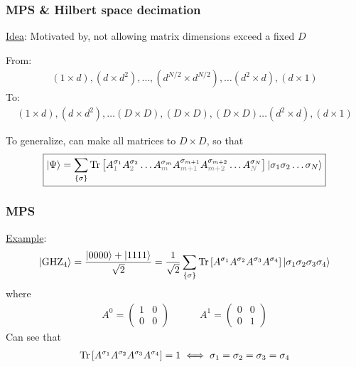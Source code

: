 \documentclass{beamer}
\theoremstyle{definition}
\newcommand{\lb}{\left[}
\newcommand{\rb}{\right]}
\newcommand{\f}[2]{\frac{#1}{#2}}
\begin{document}
\begin{frame}
	\frametitle{MPS \& Hilbert space decimation}
	\underline{Idea}: Motivated by, not allowing matrix dimensions exceed a fixed $D$\\
	
	\vspace{10pt}
	
	From:
	\begin{align*}
		{(1\times d), (d\times d^2), \dots }, {(d^{N/2}\times d^{N/2})},  {\dots (d^2\times d), (d\times 1)}
	\end{align*}
	To:
	\begin{align*}
		{(1\times d), (d\times d^2), \dots (D\times D)}, {(D \times D)},  { (D\times D)\dots (d^2\times d), (d\times 1)}
	\end{align*}
	
	\vspace{10pt}
	
	To generalize, can make all matrices to $D\times D$, so that
	\begin{align*}
		\boxed{\ket{\Psi} = \sum_{\{\sigma\}}   \Tr\lb  A_{\textcolor{gray}{1}}^{\sigma_1}A_{\textcolor{gray}{2}}^{\sigma_2}\dots A_{\textcolor{gray}{m}}^{\sigma_m}  A_{{\textcolor{gray}{m+1}}}^{\sigma_{m+1}}A_{{\textcolor{gray}{m+2}}}^{\sigma_{m+2}}\dots A_{\textcolor{gray}{N}}^{\sigma_N} \rb  \ket{\sigma_1\sigma_2\dots \sigma_N}}
	\end{align*}
	
	
	
\end{frame}


\begin{frame}
	\frametitle{MPS}
		\underline{Example}: 
	\begin{align*}
		\ket{\text{GHZ}_4} = \f{\ket{0000} + \ket{1111}}{\sqrt{2}}= \f{1}{\sqrt{2}}
		\sum_{\{\sigma\}} \Tr \lb  A^{\sigma_1} A^{\sigma_2} A^{\sigma_3} A^{\sigma_4} \rb \ket{\sigma_1\sigma_2\sigma_3\sigma_4}
	\end{align*}
	where
	\begin{align*}
		A^0 = \begin{pmatrix}
			1 & 0 \\ 0 & 0 
		\end{pmatrix} \quad\quad \quad 
	A^1 = \begin{pmatrix}
		0 & 0 \\ 0 & 1
	\end{pmatrix}
	\end{align*}
	Can see that
	\begin{align*}
		\Tr \lb  A^{\sigma_1} A^{\sigma_2} A^{\sigma_3} A^{\sigma_4} \rb = 1 \iff \sigma_1 = \sigma_2 = \sigma_3 = \sigma_4
	\end{align*}
	
\end{frame}
\end{document}
